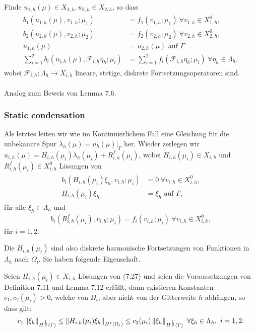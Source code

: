 Finde $u_{1,h}(\mu)\in X_{1,h}, u_{2,h}\in X_{2,h}$, so dass
\begin{align}
\begin{split}
b_1(u_{1,h}(\mu),v_{1,h};\mu_1) &= f_1(v_{1,h};\mu_1)~\forall v_{1,h}\in X_{1,h}^0,\\
b_2(u_{2,h}(\mu),v_{2,h};\mu_2) &= f_2(v_{2,h};\mu_2)~\forall v_{2,h}\in X_{2,h}^0,\\
u_{1,h}(\mu) &= u_{2,h}(\mu) \text{ auf } \Gamma\\
\sum_{i=1}^2 b_i(u_{i,h}(\mu),\mathcal{F}_{i,h}\eta_h;\mu_i) &= \sum_{i=1}^2 f_i(\mathcal{F}_{i,h}\eta_h;\mu_i) ~\forall \eta_h\in \Lambda_h,
\end{split}
\end{align}
wobei $\mathcal{F}_{i,h}: \Lambda_h \to X_{i,h}$ lineare, stetige, diskrete Fortsetzungsoperatoren sind.\\

\\
Analog zum Beweis von Lemma 7.6.

\subsubsection{Static condensation}
Als letztes leiten wir wie im Kontinuierlichem Fall eine Gleichung für die unbekannte Spur $\lambda_h(\mu) = u_h(\mu)|_\Gamma$ her.
Wieder zerlegen wir $u_{i,h}(\mu) = H_{i,h}(\mu_i)\lambda_h(\mu_i) + R_{i,h}^f(\mu_i)$, wobei $H_{i,h}(\mu_i)\in X_{i,h}$ und $R_{i,h}^f(\mu_i)\in X_{i,h}^0$ Lösungen von 
\begin{align}
\begin{split}
b_i(H_{i,h}(\mu_i)\xi_h, v_{i,h};\mu_i) &= 0 ~ \forall v_{i,h}\in X_{i,h}^0,\\
H_{i,h}(\mu_i)\xi_h &= \xi_h \text{ auf } \Gamma,
\end{split}
\end{align}
für alle $\xi_h\in \Lambda_h$ und 
\begin{align}
b_i(R_{i,h}^f(\mu_i), v_{i,h};\mu_i) = f_i(v_{i,h};\mu_i) ~\forall v_{i,h}\in X_{i,h}^0,
\end{align}
für $i=1,2$.

Die $H_{i,h}(\mu_i)$ sind also diskrete harmonische Fortsetzungen von Funktionen in $\Lambda_h$ nach $\Omega_i$.
Sie haben folgende Eigenschaft.

Seien $H_{i,h}(\mu_i)\in X_{i,h}$ Lösungen von (7.27) und seien die Voraussetzungen von Definition 7.11 und Lemma 7.12 erfüllt, dann existieren Konstanten $c_1,c_2(\mu_i) > 0$, welche von $\Omega_i$, aber nicht von der Gitterweite $h$ abhängen, so dass gilt:
\begin{align}
c_1 \left\Vert\xi_h\right\Vert_{H^{\frac{1}{2}}(\Gamma)} \le \left\Vert H_{i,h}(\mu_i)\xi_h\right\Vert_{H^1(\Omega_i)} \le c_2(\mu_i) \left\Vert\xi_h\right\Vert_{H^{\frac{1}{2}}(\Gamma)} ~\forall \xi_h\in \Lambda_h,~ i=1,2.
\end{align}

